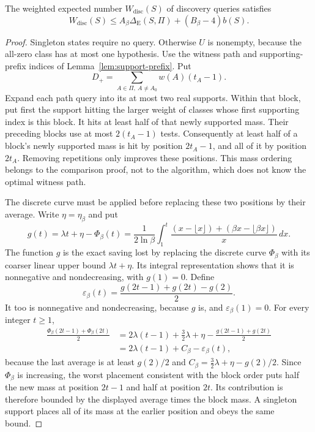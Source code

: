 \begin{lemma}\label{lem:hull-discovery}
The weighted expected number $W_{\mathrm{disc}}(S)$ of discovery
queries satisfies
\[
 W_{\mathrm{disc}}(S)\le
 A_\beta\Delta_{\mathrm E}(S,\Pi)+(B_\beta-4)b(S).
\]
\end{lemma}
\begin{proof}
Singleton states require no query. Otherwise $U$ is nonempty,
because the all-zero class has at most one hypothesis.
Use the witness path and supporting-prefix indices of
Lemma~\ref{lem:support-prefix}. Put
\[
 D_+=\sum_{A\in\Pi,\ A\ne A_0}w(A)(t_A-1).
\]
Expand each path query into its at most two real supports.
Within that block, put first the support hitting the larger
weight of classes whose first supporting index is this block.
It hits at least half of that newly supported mass.
Their preceding blocks use at most $2(t_A-1)$ tests.
Consequently at least half of a block's newly supported mass is
hit by position $2t_A-1$, and all of it by position $2t_A$.
Removing repetitions only improves these positions.
This mass ordering belongs to the comparison proof, not to the
algorithm, which does not know the optimal witness path.

The discrete curve must be applied before replacing these two
positions by their average. Write $\eta=\eta_\beta$ and put
\[
 g(t)=\lambda t+\eta-\Phi_\beta(t)
     =\frac1{2\ln\beta}\int_1^t
       \frac{(x-\lfloor x\rfloor)
              +(\beta x-\lfloor\beta x\rfloor)}x\,dx.
\]
The function $g$ is the exact saving lost by replacing the discrete
curve $\Phi_\beta$ with its coarser linear upper bound
$\lambda t+\eta$. Its integral representation shows that it is
nonnegative and nondecreasing, with $g(1)=0$.
Define
\[
 \varepsilon_\beta(t)
 =\frac{g(2t-1)+g(2t)-g(2)}2.
\]
It too is nonnegative and nondecreasing, because $g$ is, and
$\varepsilon_\beta(1)=0$.
For every integer $t\ge1$,
\[
 \begin{aligned}
 \frac{\Phi_\beta(2t-1)+\Phi_\beta(2t)}2
 &=2\lambda(t-1)+\frac32\lambda+\eta
     -\frac{g(2t-1)+g(2t)}2\\
 &=2\lambda(t-1)+C_\beta-\varepsilon_\beta(t),
 \end{aligned}
\]
because the last average is at least $g(2)/2$ and
$C_\beta=\frac32\lambda+\eta-g(2)/2$.
Since $\Phi_\beta$ is increasing, the worst placement consistent
with the block order puts half the new mass at position $2t-1$ and
half at position $2t$. Its contribution is therefore bounded by
the displayed average times the block mass. A singleton support
places all of its mass at the earlier position and obeys the same
bound.


\end{proof}
